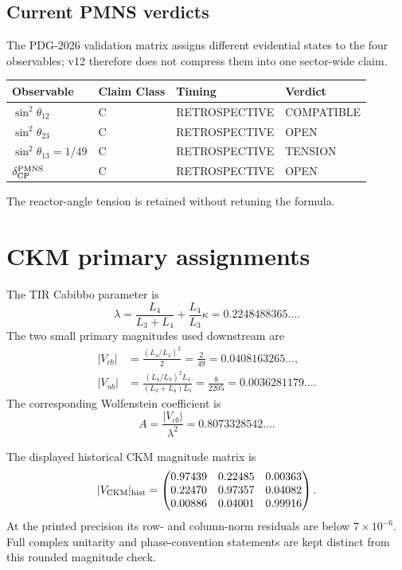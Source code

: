 \subsection{Current PMNS verdicts}
The PDG-2026 validation matrix assigns different evidential states to the four
observables; v12 therefore does not compress them into one sector-wide claim.

{\setlength{\tabcolsep}{3pt}
\begin{longtable}{p{}p{}p{}p{}}
\toprule
Observable & Claim Class & Timing & Verdict\\
\midrule
$\sin^2\theta_{12}$ & C & RETROSPECTIVE & COMPATIBLE\\
$\sin^2\theta_{23}$ & C & RETROSPECTIVE & OPEN\\
$\sin^2\theta_{13}=1/49$ & C & RETROSPECTIVE & TENSION\\
$\delta_{\rm CP}^{\rm PMNS}$ & C & RETROSPECTIVE & OPEN\\
\bottomrule
\end{longtable}}
The reactor-angle tension is retained without retuning the formula.

\section{CKM primary assignments}
The TIR Cabibbo parameter is
\begin{equation}
\boxed{
\lambda
=\frac{L_4}{L_3+L_4}
+\frac{L_4}{L_3}\kappa
=0.2248488365\ldots .
}
\label{eq:v12-ckm-lambda}
\end{equation}
The two small primary magnitudes used downstream are
\begin{align}
|V_{cb}|
&=\frac{(L_4/L_3)^2}{2}
=\frac2{49}
=0.0408163265\ldots,
\label{eq:v12-ckm-vcb}\\
|V_{ub}|
&=\frac{(L_4/L_3)^2L_4}{(L_3+L_4)L_5}
=\frac8{2205}
=0.0036281179\ldots .
\label{eq:v12-ckm-vub}
\end{align}
The corresponding Wolfenstein coefficient is
\begin{equation}
A=\frac{|V_{cb}|}{\lambda^2}
=0.8073328542\ldots .
\label{eq:v12-ckm-A}
\end{equation}

The displayed historical CKM magnitude matrix is
\begin{equation}
|V_{\rm CKM}|_{\rm hist}
=\begin{pmatrix}
0.97439 & 0.22485 & 0.00363\\
0.22470 & 0.97357 & 0.04082\\
0.00886 & 0.04001 & 0.99916
\end{pmatrix}.
\label{eq:v12-ckm-magnitude-matrix}
\end{equation}
At the printed precision its row- and column-norm residuals are below
$7\times10^{-6}$.  Full complex unitarity and phase-convention statements are
kept distinct from this rounded magnitude check.

